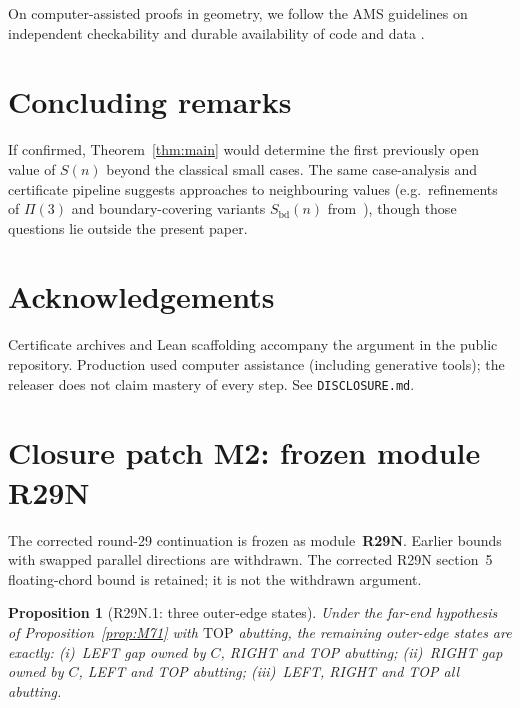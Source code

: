 \documentclass[11pt,reqno]{amsart}
\newtheorem{proposition}[theorem]{Proposition}
\theoremstyle{definition}
\newcommand{\TOP}{\mathrm{TOP}}
\begin{document}
On computer-assisted proofs in geometry, we follow the AMS guidelines on
independent checkability and durable availability of code and data
\cite{AMSComputerAssisted}.

\section{Concluding remarks}\label{sec:conclusion}

If confirmed, Theorem~\ref{thm:main} would determine the first previously open
value of $S(n)$ beyond the classical small cases.  The same case-analysis and certificate
pipeline suggests approaches to neighbouring values (e.g.\ refinements of
$\Pi(3)$ and boundary-covering variants $S_{\mathrm{bd}}(n)$ from~\cite{DLT2026}),
though those questions lie outside the present paper.

\section*{Acknowledgements}
Certificate archives and Lean scaffolding accompany the argument in the public
repository.  Production used computer assistance (including generative tools);
the releaser does not claim mastery of every step.  See
\texttt{DISCLOSURE.md}.


\appendix

\section{Closure patch M2: frozen module R29N}\label{app:M2}

The corrected round-29 continuation is frozen as module~\textbf{R29N}. Earlier bounds with swapped parallel directions are withdrawn. The corrected R29N section~5 floating-chord bound is retained; it is not the withdrawn argument.

\begin{proposition}[R29N.1: three outer-edge states]\label{prop:R29N1}
Under the far-end hypothesis of Proposition~\ref{prop:M71} with $\TOP$
abutting, the remaining outer-edge states are exactly: (i)~LEFT gap owned by
$C$, RIGHT and TOP abutting; (ii)~RIGHT gap owned by $C$, LEFT and TOP
abutting; (iii)~LEFT, RIGHT and TOP all abutting.
\end{proposition}
\end{document}
